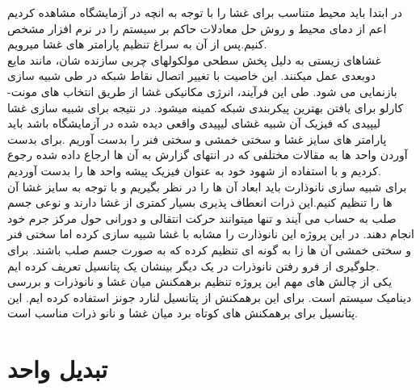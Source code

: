 \documentclass[12pt,onecolumn,a4paper]{report}
\begin{document}
در ابتدا باید محیط متناسب برای غشا را با توجه به انچه در آزمایشگاه مشاهده کردیم اعم از دمای محیط و روش حل معادلات حاکم بر سیستم را  در نرم افزار مشخص کنیم.پس از آن به سراغ تنظیم پارامتر های غشا میرویم.\\
غشاهای زیستی به دلیل پخش سطحی مولکولهای
چربی سازنده شان، مانند مایع دوبعدی عمل میکنند. این خاصیت با تغییر اتصال نقاط شبکه
در طی شبیه سازی بازنمایی می شود. طی این فرآیند، انرژی مکانیکی غشا از طریق انتخاب های
مونت-کارلو برای یافتن بهترین پیکربندی شبکه کمینه میشود.
در نتیجه برای شبیه سازی غشا لیپیدی که فیزیک آن شبیه غشای لیپیدی واقعی دیده شده در آزمایشگاه باشد باید پارامتر های سایز غشا  و سختی خمشی و سختی فنر را بدست آوریم .برای بدست آوردن واحد ها به مقالات مختلفی که در انتهای گزارش به آن ها ارجاع داده شده رجوع کردیم و با استفاده از شهود خود به عنوان فیزیک پیشه واحد ها را بدست آوردیم.\\
برای شبیه سازی نانوذارت باید ابعاد آن ها را در نظر بگیریم و با توجه به سایز غشا آن ها را تنظیم کنیم.این ذرات انعطاف پذیری بسیار کمتری از غشا دارند و نوعی جسم صلب به حساب می آیند و تنها میتوانند حرکت انتقالی و دورانی حول مرکز جرم خود انجام دهند. در این پروژه این نانوذارت را مشابه با غشا شبیه سازی کرده اما سختی فنر و سختی خمشی آن ها زا به گونه ای تنظیم کرده که به صورت جسم صلب باشند. برای جلوگیری از فرو رفتن نانوذرات در یک دیگر بینشان یک پتانسیل تعریف کرده ایم. \\
یکی از چالش های مهم این پروژه تنظیم برهمکنش میان غشا و نانوذرات و بررسی دینامیک سیستم است. برای این برهمکنش از پتانسیل لنارد جونز استفاده کرده ایم. این پتانسیل برای برهمکنش های کوتاه برد میان غشا و نانو ذرات مناسب است.




\section{\LARGE{تبدیل واحد}}
\end{document}
